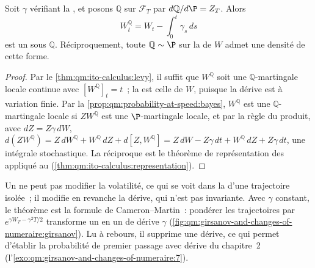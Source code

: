 \begin{theorem}[Girsanov]\label{thm:qm:girsanov-and-changes-of-numeraire:girsanov}
Soit $\gamma$ vérifiant la , et posons $\mathbb Q$ sur $\mathcal F_T$ par $d\mathbb Q/d\P = Z_T$. Alors
\[
W^{\mathbb Q}_t = W_t - \int_0^t\gamma_s\,ds
\]
est un  sous $\mathbb Q$. Réciproquement, toute $\mathbb Q \sim \P$ sur la  de $W$ admet une densité
de cette forme.
\end{theorem}

\begin{proof}
Par le \cref{thm:qm:ito-calculus:levy}, il suffit que $W^{\mathbb Q}$ soit une $\mathbb Q$-martingale locale continue avec
$[W^{\mathbb Q}]_t = t$~; la  est celle de $W$, puisque la dérive est à variation finie.
Par la \cref{prop:qm:probability-at-speed:bayes}, $W^{\mathbb Q}$ est une $\mathbb Q$-martingale locale si $ZW^{\mathbb Q}$ est une
$\P$-martingale locale, et par la règle du produit, avec $dZ = Z\gamma\,dW$,
$d(ZW^{\mathbb Q}) = Z\,dW^{\mathbb Q} + W^{\mathbb Q}\,dZ + d[Z, W^{\mathbb Q}] = Z\,dW - Z\gamma\,dt + W^{\mathbb Q}\,dZ + Z\gamma\,dt$, une
intégrale stochastique. La réciproque est le théorème de représentation des  appliqué au
 (\cref{thm:qm:ito-calculus:representation}).
\end{proof}

Un  ne peut pas modifier la volatilité, ce qui se voit dans la  d'une
trajectoire isolée~; il modifie en revanche la dérive, qui n'est pas invariante. Avec $\gamma$ constant, le théorème est la
formule de Cameron--Martin~: pondérer les trajectoires par $e^{\gamma W_T - \gamma^2T/2}$ transforme un  en un
 de dérive $\gamma$ (\cref{fig:qm:girsanov-and-changes-of-numeraire:girsanov}). Lu à rebours, il supprime une
dérive, ce qui permet d'établir la probabilité de premier passage avec dérive du chapitre~2
(l'\cref{exo:qm:girsanov-and-changes-of-numeraire:7}).

